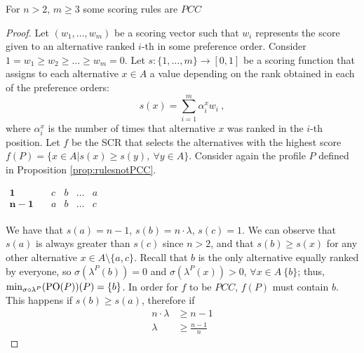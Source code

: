 \documentclass[version=3.21, pagesize, twoside=off, bibliography=totoc, DIV=calc, fontsize=12pt, a4paper]{scrartcl}
\begin{document}
\begin{proposition}
	\label{th:bound}
	For $n>2$, $m\geq3$ some scoring rules are  $PCC$ 
\end{proposition}
\begin{proof}
	Let $(w_1, \dots, w_m)$ be a scoring vector such that $w_i$ represents the score given to an alternative ranked $i$-th in some preference order. Consider $1 = w_1 \geq w_2 \geq \dots \geq w_{m} = 0$. Let $s:\{1,\dots,m\}\rightarrow [0,1]$ be a scoring function that assigns to each alternative $x \in A$ a value depending on the rank obtained in each of the preference orders: 
	\[ s(x) = \sum_{i=1}^{m} \alpha^{x}_i w_i \ ,\]
	where $\alpha^{x}_i$ is the number of times that alternative $x$ was ranked in the $i$-th position. Let $f$ be the SCR that selects the alternatives with the highest score $f(P)=\{x \in A | s(x)\geq s(y), \ \forall y \in A\}$.
	Consider again the profile $P$ defined in Proposition \ref{prop:rulesnotPCC}.
	\begin{center}
		$
		\begin{array}{ccccc}
		\mathbf{1} \quad &c&b&\dots &a\\
		\mathbf{n-1} \quad &a&b&\dots &c\\		
		\end{array}
		$
	\end{center}
	We have that $s(a)=n-1$, $s(b)=n\cdot \lambda$, $s(c)=1$. We can observe that $s(a)$ is always greater than $s(c)$ since $n>2$, and that $s(b)\geq s(x)$ for any other alternative $x\in A \setminus \{a,c\}$. Recall that $b$ is the only alternative equally ranked by everyone, so $\sigma(\lambda^P(b))=0$ and $\sigma(\lambda^P(x))>0$, $\forall x \in A \ \{b\}$; thus, $\mustar(P)=\{b\}$. In order for $f$ to be $PCC$, $f(P)$ must contain $b$. This happens if $s(b)\geq s(a)$, therefore if 
	\begin{align}
	n\cdot\lambda &\geq n-1 \\
	\lambda &\geq \frac{n-1}{n} 
	\end{align}
\end{proof}
\end{document}
